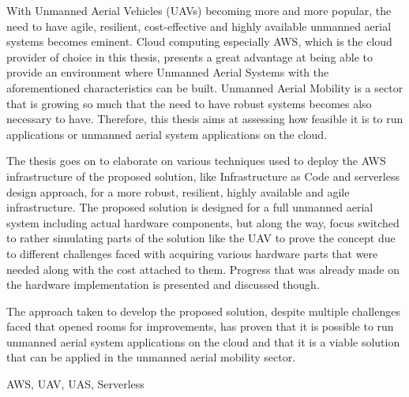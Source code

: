 \cleardoublepage

\abstract

With Unmanned Aerial Vehicles (UAVs) becoming more and more popular, the need to have agile, resilient, cost-effective and highly available unmanned aerial systems becomes eminent. Cloud computing especially AWS, which is the cloud provider of choice in this thesis, presents a great advantage at being able to provide an environment where Unmanned Aerial Systems with the aforementioned characteristics can be built. Unmanned Aerial Mobility is a sector that is growing so much that the need to have robust systems becomes also necessary to have. Therefore, this thesis aims at assessing how feasible it is to run applications or unmanned aerial system applications on the cloud.

The thesis goes on to elaborate on various techniques used to deploy the AWS infrastructure of the proposed solution, like Infrastructure as Code and serverless design approach, for a more robust, resilient, highly available and agile infrastructure. The proposed solution is designed for a full unmanned aerial system including actual hardware components, but along the way, focus switched to rather simulating parts of the solution like the UAV to prove the concept due to different challenges faced with acquiring various hardware parts that were needed along with the cost attached to them. Progress that was already made on the hardware implementation is presented and discussed though.

The approach taken to develop the proposed solution, despite multiple challenges faced that opened rooms for improvements, has proven that it is possible to run unmanned aerial system applications on the cloud and that it is a viable solution that can be applied in the unmanned aerial mobility sector.

\keywords AWS, UAV, UAS, Serverless